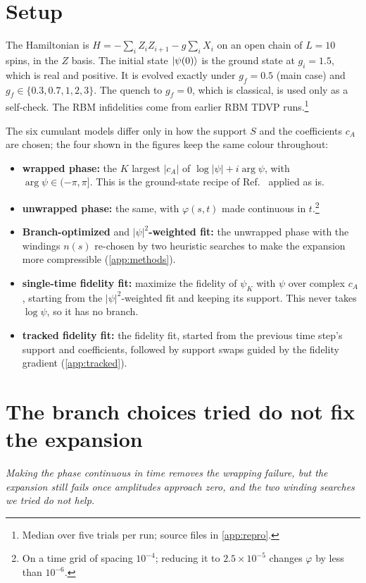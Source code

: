 \documentclass[11pt,a4paper]{article}
\newcommand{\tracked}{\textcolor{ctracked}{tracked fidelity fit}}
\newcommand{\fidfit}{\textcolor{cfid}{single-time fidelity fit}}
\newcommand{\unwrapped}{\textcolor{cunwrap}{unwrapped phase}}
\newcommand{\wrapped}{\textcolor{cwrap}{wrapped phase}}
\begin{document}
\section{Setup}\label{sec:setup}
The Hamiltonian is $H=-\sum_i Z_iZ_{i+1}-g\sum_i X_i$ on an open chain of $L=10$ spins, in the $Z$ basis. The initial state $\ket{\psi(0)}$ is the ground state at $g_i=1.5$, which is real and positive. It is evolved exactly under $g_f=0.5$ (main case) and $g_f\in\{0.3,0.7,1,2,3\}$. The quench to $g_f=0$, which is classical, is used only as a self-check. The RBM infidelities come from earlier RBM TDVP runs.\footnote{Median over five trials per run; source files in \cref{app:repro}.}

The six cumulant models differ only in how the support $S$ and the coefficients $c_A$ are chosen; the four shown in the figures keep the same colour throughout:
\begin{itemize}
  \item \textbf{\wrapped:} the $K$ largest $|c_A|$ of $\log|\psi|+i\arg\psi$, with $\arg\psi\in(-\pi,\pi]$. This is the ground-state recipe of Ref.~\cite{Cortes25} applied as is.
  \item \textbf{\unwrapped:} the same, with $\varphi(s,t)$ made continuous in $t$.\footnote{On a time grid of spacing $10^{-4}$; reducing it to $2.5\times10^{-5}$ changes $\varphi$ by less than $10^{-6}$.}
  \item \textbf{Branch-optimized} and \textbf{$|\psi|^2$-weighted fit:} the unwrapped phase with the windings $n(s)$ re-chosen by two heuristic searches to make the expansion more compressible (\cref{app:methods}).
  \item \textbf{\fidfit:} maximize the fidelity of $\psi_K$ with $\psi$ over complex $c_A$, starting from the $|\psi|^2$-weighted fit and keeping its support. This never takes $\log\psi$, so it has no branch.
  \item \textbf{\tracked:} the fidelity fit, started from the previous time step's support and coefficients, followed by support swaps guided by the fidelity gradient (\cref{app:tracked}).
\end{itemize}

\section{The branch choices tried do not fix the expansion}\label{sec:fail}
\emph{Making the phase continuous in time removes the wrapping failure, but the expansion still fails once amplitudes approach zero, and the two winding searches we tried do not help.}
\end{document}
